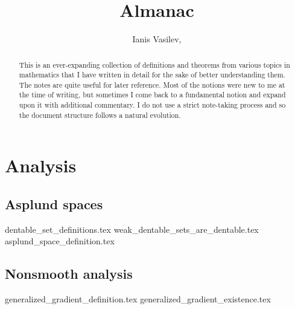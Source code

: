 \documentclass[numbers=endperiod, bibliography=totocnumbered]{scrartcl}
\title{Almanac}
\author{Ianis Vasilev, \Email{ianis@ivasilev.net}}
\date{}
\begin{document}
\maketitle

\begin{abstract}
  This is an ever-expanding collection of definitions and theorems from various topics in mathematics that I have written in detail for the sake of better understanding them. The notes are quite useful for later reference. Most of the notions were new to me at the time of writing, but sometimes I come back to a fundamental notion and expand upon it with additional commentary. I do not use a strict note-taking process and so the document structure follows a natural evolution.
\end{abstract}

\tableofcontents

\section{Analysis}
\subsection{Asplund spaces}
{dentable_set_definitions.tex}
{weak_dentable_sets_are_dentable.tex}
{asplund_space_definition.tex}

\subsection{Nonsmooth analysis}
{generalized_gradient_definition.tex}
{generalized_gradient_existence.tex}

\printbibliography
\end{document}
